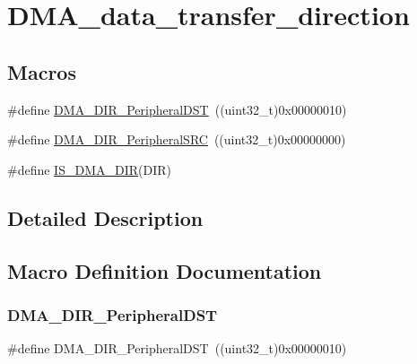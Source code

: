 \hypertarget{group___d_m_a__data__transfer__direction}{}\section{D\+M\+A\+\_\+data\+\_\+transfer\+\_\+direction}
\label{group___d_m_a__data__transfer__direction}
\subsection*{Macros}
\begin{DoxyCompactItemize}
\item 
\#define \mbox{\hyperlink{group___d_m_a__data__transfer__direction_ga51567b748ddac277743c65c20275971a}{D\+M\+A\+\_\+\+D\+I\+R\+\_\+\+Peripheral\+D\+ST}}~((uint32\+\_\+t)0x00000010)
\item 
\#define \mbox{\hyperlink{group___d_m_a__data__transfer__direction_ga5ce120a044359410136695a2c05df68e}{D\+M\+A\+\_\+\+D\+I\+R\+\_\+\+Peripheral\+S\+RC}}~((uint32\+\_\+t)0x00000000)
\item 
\#define \mbox{\hyperlink{group___d_m_a__data__transfer__direction_gaaad13d2b5808e32a35a2d21bcdbb2296}{I\+S\+\_\+\+D\+M\+A\+\_\+\+D\+IR}}(D\+IR)
\end{DoxyCompactItemize}


\subsection{Detailed Description}


\subsection{Macro Definition Documentation}
\mbox{\label{group___d_m_a__data__transfer__direction_ga51567b748ddac277743c65c20275971a}} 
\subsubsection{\texorpdfstring{DMA\_DIR\_PeripheralDST}{DMA\_DIR\_PeripheralDST}}
{\footnotesize\ttfamily \#define D\+M\+A\+\_\+\+D\+I\+R\+\_\+\+Peripheral\+D\+ST~((uint32\+\_\+t)0x00000010)}

